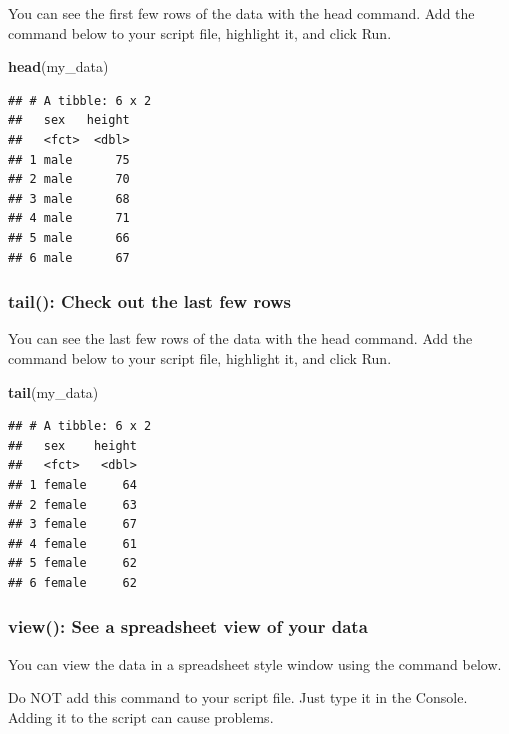 \documentclass[
]{krantz}
\makeatletter
\newenvironment{Shaded}{\begin{snugshade}}{\end{snugshade}}
\newcommand{\KeywordTok}[1]{\textcolor[rgb]{0.27,0.27,0.27}{\textbf{#1}}}
\newcommand{\NormalTok}[1]{#1}
\newenvironment{kframe}{%
\medskip{}
\setlength{\fboxsep}{.8em}
 \def\at@end@of@kframe{}%
 \ifinner\ifhmode%
  \def\at@end@of@kframe{\end{minipage}}%
  \begin{minipage}{\columnwidth}%
 \fi\fi%
 \def\FrameCommand##1{\hskip\@totalleftmargin \hskip-\fboxsep
 \colorbox{shadecolor}{##1}\hskip-\fboxsep
     \hskip-\linewidth \hskip-\@totalleftmargin \hskip\columnwidth}%
 \MakeFramed {\advance\hsize-\width
   \@totalleftmargin\z@ \linewidth\hsize
   \@setminipage}}%
 {\par\unskip\endMakeFramed%
 \at@end@of@kframe}
\renewenvironment{Shaded}{\begin{kframe}}{\end{kframe}}
\makeatother
\begin{document}
You can see the first few rows of the data with the head command. Add the command below to your script file, highlight it, and click Run.

\begin{Shaded}
\begin{Highlighting}[]
\KeywordTok{head}\NormalTok{(my_data)}
\end{Highlighting}
\end{Shaded}

\begin{verbatim}
## # A tibble: 6 x 2
##   sex   height
##   <fct>  <dbl>
## 1 male      75
## 2 male      70
## 3 male      68
## 4 male      71
## 5 male      66
## 6 male      67
\end{verbatim}

\hypertarget{tail-check-out-the-last-few-rows}{%
\subsubsection{tail(): Check out the last few rows}\label{tail-check-out-the-last-few-rows}}

You can see the last few rows of the data with the head command. Add the command below to your script file, highlight it, and click Run.

\begin{Shaded}
\begin{Highlighting}[]
\KeywordTok{tail}\NormalTok{(my_data)}
\end{Highlighting}
\end{Shaded}

\begin{verbatim}
## # A tibble: 6 x 2
##   sex    height
##   <fct>   <dbl>
## 1 female     64
## 2 female     63
## 3 female     67
## 4 female     61
## 5 female     62
## 6 female     62
\end{verbatim}

\hypertarget{view-see-a-spreadsheet-view-of-your-data}{%
\subsubsection{view(): See a spreadsheet view of your data}\label{view-see-a-spreadsheet-view-of-your-data}}

You can view the data in a spreadsheet style window using the command below.

Do NOT add this command to your script file. Just type it in the Console. Adding it to the script can cause problems.
\end{document}
